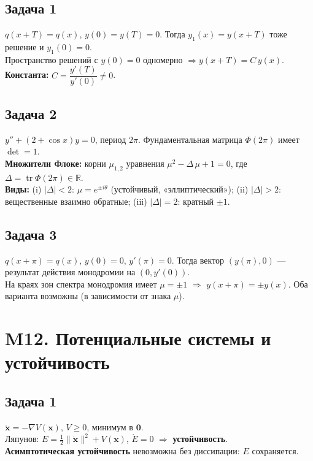 \documentclass[12pt]{article}
\begin{document}
\subsection*{Задача 1}
$q(x+T)=q(x)$, $y(0)=y(T)=0$. Тогда $y_1(x)=y(x+T)$ тоже решение и $y_1(0)=0$. \\
Пространство решений с $y(0)=0$ одномерно $\Rightarrow y(x+T)=C\,y(x)$. \\
\textbf{Константа: } $C=\dfrac{y'(T)}{y'(0)}\ne0$.

\subsection*{Задача 2}
$y''+(2+\cos x)y=0$, период $2\pi$. Фундаментальная матрица $\Phi(2\pi)$ имеет $\det=1$. \\
\textbf{Множители Флоке: } корни $\mu_{1,2}$ уравнения $\mu^2-\Delta\,\mu+1=0$, где $\Delta=\operatorname{tr}\Phi(2\pi)\in\mathbb{R}$. \\
\textbf{Виды: } 
(i) $|\Delta|<2$: $\mu=e^{\pm i\theta}$ (устойчивый, «эллиптический»); 
(ii) $|\Delta|>2$: вещественные взаимно обратные; 
(iii) $|\Delta|=2$: кратный $\pm1$.

\subsection*{Задача 3}
$q(x+\pi)=q(x)$, $y(0)=0$, $y'(\pi)=0$. Тогда вектор $(y(\pi),0)$ — результат действия монодромии на $(0,y'(0))$. \\
На краях зон спектра монодромия имеет $\mu=\pm1$ $\Rightarrow$ \textbf{$y(x+\pi)=\pm y(x)$}. Оба варианта возможны (в зависимости от знака \(\mu\)).

\section*{M12. Потенциальные системы и устойчивость}

\subsection*{Задача 1}
$\ddot{\mathbf x}=-\nabla V(\mathbf x)$, $V\ge0$, минимум в $\mathbf0$. \\
Ляпунов: $E=\tfrac12\|\dot{\mathbf x}\|^2+V(\mathbf x)$, $\dot E=0$ $\Rightarrow$ \textbf{устойчивость}. \\
\textbf{Асимптотическая устойчивость} невозможна без диссипации: $E$ сохраняется.
\end{document}
